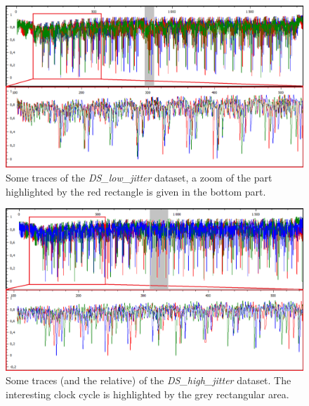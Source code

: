 
\begin{figure}
\centering
\includegraphics[width=.7\textwidth]{../Figures/CHES2017/jitter_2_2_framed.png} 
\caption{Some traces of the \emph{DS\_low\_jitter} dataset, a zoom of the part highlighted by the red rectangle is given in the bottom part. }\label{fig:jitter_traces22}
\end{figure}

\begin{figure}
\centering
\includegraphics[width=.7\textwidth]{../Figures/CHES2017/jitter_6_6_framed.png} 
\caption{Some traces (and the relative) of the \emph{DS\_high\_jitter} dataset. The interesting clock cycle is highlighted by the grey rectangular area.}\label{fig:jitter_traces66}
\end{figure}


